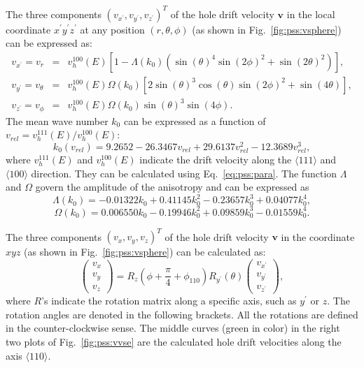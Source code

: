 The three components $(v_{x^{\prime}}, v_{y^{\prime}}, v_{z^{\prime}})^{T}$ of the hole drift velocity $\mathbf{v}$ in the local coordinate $x^{\prime}y^{\prime}z^{\prime}$ at any position $(r, \theta, \phi)$ (as shown in Fig.~\ref{fig:pss:vsphere}) can be expressed as:
\begin{equation}
\label{eq:pss:vsphere}
\begin{array}{rcl}
v_{x^{\prime}} = v_{r} &=& v^{100}_{h}(E)[1-\Lambda(k_{0})(\sin(\theta)^{4}\sin(2\phi)^{2} + \sin(2\theta)^{2})],\\
v_{y^{\prime}} = v_{\theta} &=& v^{100}_{h}(E)\Omega(k_{0})[2\sin(\theta)^{3}\cos(\theta)\sin(2\phi)^{2} + \sin(4\theta)],\\
v_{z^{\prime}} = v_{\phi} &=& v^{100}_{h}(E)\Omega(k_{0})\sin(\theta)^{3}\sin(4\phi).
\end{array}
\end{equation}
The mean wave number $k_{0}$ can be expressed as a function of $v_{rel} = v^{111}_{h}(E)/v^{100}_{h}(E)$:
\begin{equation}
\label{eq:pss:k0}
k_{0}(v_{rel}) = 9.2652 - 26.3467v_{rel} + 29.6137v_{rel}^{2} - 12.3689v_{rel}^{3},
\end{equation}
where $v^{111}_{h}(E)$ and $v^{100}_{h}(E)$ indicate the drift velocity along the $\langle111\rangle$ and $\langle100\rangle$ direction. They can be calculated using Eq.~\ref{eq:pss:para}. The function $\Lambda$ and $\Omega$ govern the amplitude of the anisotropy and can be expressed as
\begin{equation}
\label{eq:pss:lamb}
\Lambda(k_{0}) = -0.01322k_{0} + 0.41145k_{0}^{2} - 0.23657k_{0}^{3} + 0.04077k_{0}^{4},
\end{equation}
\begin{equation}
\label{eq:pss:ome}
\Omega(k_{0}) = 0.006550k_{0} - 0.19946k_{0}^{2} + 0.09859k_{0}^{3} - 0.01559k_{0}^{4}.
\end{equation}

The three components $(v_{x}, v_{y}, v_{z})^{T}$ of the hole drift velocity $\mathbf{v}$ in the coordinate $xyz$ (as shown in Fig.~\ref{fig:pss:vsphere}) can be calculated as:
\begin{equation}
\label{eq:pss:v2v}  
\left(
\begin{array}{c}
v_{x} \\ v_{y} \\ v_{z}
\end{array}
\right) = R_{z}(\phi + \frac{\pi}{4} + \phi_{110}) R_{y^{\prime}}(\theta) \left( 
\begin{array}{c}
v_{x^{\prime}} \\ v_{y^{\prime}} \\ v_{z^{\prime}}
\end{array} \right),
\end{equation}
where $R$'s indicate the rotation matrix along a specific axis, such as $y^{\prime}$ or $z$. The rotation angles are denoted in the following brackets. All the rotations are defined in the counter-clockwise sense. The middle curves (green in color) in the right two plots of Fig.~\ref{fig:pss:vvse} are the calculated hole drift velocities along the axis $\langle 110 \rangle$.


